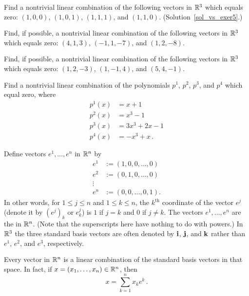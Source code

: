 \begin{exer}\label{vs_exer5}  Find a nontrivial linear combination of the following vectors in
$\mathbb{R}^3$ which equals zero: $(1,0,0)$, $(1,0,1)$, $(1,1,1)$, and $(1,1,0)$.
(Solution~\ref{sol_vs_exer5}.)
\end{exer}

\begin{prob} Find, if possible, a nontrivial linear combination of the following vectors in
$\mathbb{R}^3$ which equals zero: $(4,1,3)$, $(-1,1,-7)$, and $(1,2,-8)$.
\end{prob}

\begin{prob} Find, if possible, a nontrivial linear combination of the following vectors in $\mathbb{R}^3$
which equals zero: $(1,2,-3)$, $(1,-1,4)$, and $(5,4,-1)$.
\end{prob}

\begin{prob} Find a nontrivial linear combination of the polynomials $p^1$, $p^2$, $p^3$, and $p^4$
which equal zero, where
 \begin{align*}
       p^1(x) &= x + 1 \\
       p^2(x) &= x^3 - 1 \\
       p^3(x) &= 3x^3 + 2x - 1 \\
       p^4(x) &= -x^3 + x\,.
 \end{align*}
\end{prob}

\begin{exam}\label{basis_vect} Define vectors $e^1,\dots , e^n$ in $\mathbb{R}^n$ by
 \begin{align*}
        e^1 &:= (1,0,0, \dots, 0) \\
        e^2 &:= (0,1,0, \dots, 0) \\
     \vdots &{} \\
        e^n &:= (0,0, \dots ,0,1).
 \end{align*}
In other words, for $1 \le j \le n$ and $1 \le k \le n$, the $k^{\text{th}}$ coordinate of the
vector $e^j$ (denote it by $(e^j)_k$ or $e_k^j$) is $1$ if $j=k$ and $0$ if $j \ne k$.  The
vectors $e^1, \dots, e^n$ are the
 in $\mathbb{R}^n$.  (Note that the superscripts here have nothing to do
with powers.)  In $\mathbb{R}^3$ the three standard basis vectors are often denoted by $\mathbf{i}$, $\mathbf{j}$, and $\mathbf{k}$ rather than $e^1$, $e^2$, and $e^3$, respectively.

Every vector in $\mathbb{R}^n$ is a linear combination of the standard basis vectors in that space. In
fact, if $x = (x_1, \dots, x_n) \in \mathbb{R}^n$, then
  \[ x = \sum_{k=1}^n x_ke^k\,. \]
\end{exam}

